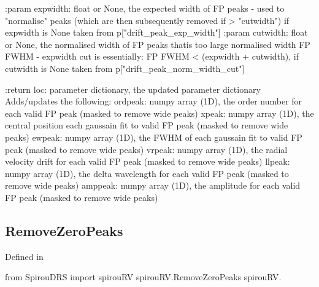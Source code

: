 \begin{minipage}{\textwidth}
\begin{pythondocstring}
:param expwidth: float or None, the expected width of FP peaks - used to
                 "normalise" peaks (which are then subsequently removed
                 if > "cutwidth") if expwidth is None taken from
                 p["drift_peak_exp_width"]
:param cutwidth: float or None, the normalised width of FP peaks thatis too
                 large normalised width FP FWHM - expwidth
                 cut is essentially: FP FWHM < (expwidth + cutwidth), if
                 cutwidth is None taken from p["drift_peak_norm_width_cut"]

:return loc: parameter dictionary, the updated parameter dictionary
        Adds/updates the following:
            ordpeak: numpy array (1D), the order number for each valid FP
                     peak (masked to remove wide peaks)
            xpeak: numpy array (1D), the central position each gaussain fit
                   to valid FP peak (masked to remove wide peaks)
            ewpeak: numpy array (1D), the FWHM of each gaussain fit
                    to valid FP peak (masked to remove wide peaks)
            vrpeak: numpy array (1D), the radial velocity drift for each
                    valid FP peak (masked to remove wide peaks)
            llpeak: numpy array (1D), the delta wavelength for each valid
                    FP peak (masked to remove wide peaks)
            amppeak: numpy array (1D), the amplitude for each valid FP peak
                     (masked to remove wide peaks)
\end{pythondocstring}
\end{minipage}

\begin{minipage}{\textwidth}
\subsection{RemoveZeroPeaks}

Defined in \spirouRV{}

\begin{pythonbox}
from SpirouDRS import spirouRV
spirouRV.RemoveZeroPeaks
spirouRV.
\end{pythonbox}

\begin{pythondocstring}

\end{pythondocstring}
\end{minipage}

